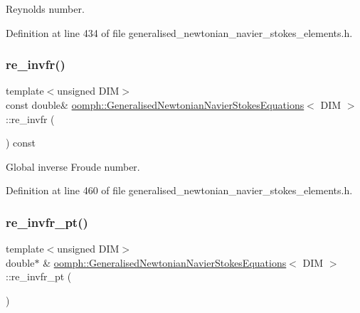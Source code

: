 Reynolds number. 



Definition at line 434 of file generalised\+\_\+newtonian\+\_\+navier\+\_\+stokes\+\_\+elements.\+h.

\mbox{\label{classoomph_1_1GeneralisedNewtonianNavierStokesEquations_a47027d97882d72c83ee210ac085a92e6}} 
\subsubsection{\texorpdfstring{re\+\_\+invfr()}{re\_invfr()}}
{\footnotesize\ttfamily template$<$unsigned D\+IM$>$ \\
const double\& \hyperlink{classoomph_1_1GeneralisedNewtonianNavierStokesEquations}{oomph\+::\+Generalised\+Newtonian\+Navier\+Stokes\+Equations}$<$ D\+IM $>$\+::re\+\_\+invfr (\begin{DoxyParamCaption}{ }\end{DoxyParamCaption}) const\hspace{0.3cm}{\ttfamily [inline]}}



Global inverse Froude number. 



Definition at line 460 of file generalised\+\_\+newtonian\+\_\+navier\+\_\+stokes\+\_\+elements.\+h.

\mbox{\label{classoomph_1_1GeneralisedNewtonianNavierStokesEquations_a4808b5b9371cfc185d1d477efe328401}} 
\subsubsection{\texorpdfstring{re\+\_\+invfr\+\_\+pt()}{re\_invfr\_pt()}}
{\footnotesize\ttfamily template$<$unsigned D\+IM$>$ \\
double$\ast$ \& \hyperlink{classoomph_1_1GeneralisedNewtonianNavierStokesEquations}{oomph\+::\+Generalised\+Newtonian\+Navier\+Stokes\+Equations}$<$ D\+IM $>$\+::re\+\_\+invfr\+\_\+pt (\begin{DoxyParamCaption}{ }\end{DoxyParamCaption})\hspace{0.3cm}{\ttfamily [inline]}}



